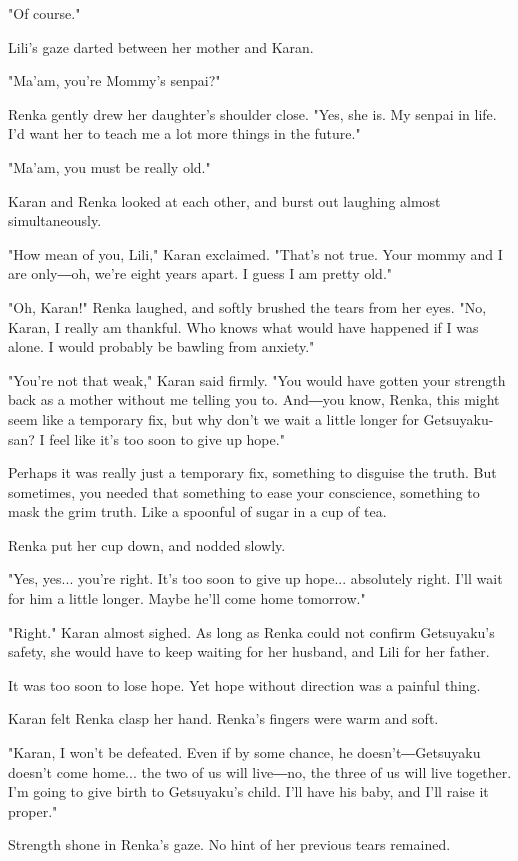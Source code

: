 "Of course."

Lili's gaze darted between her mother and Karan.

"Ma'am, you're Mommy's senpai?"

Renka gently drew her daughter's shoulder close. "Yes, she is. My senpai
in life. I'd want her to teach me a lot more things in the future."

"Ma'am, you must be really old."

Karan and Renka looked at each other, and burst out laughing almost
simultaneously.

"How mean of you, Lili," Karan exclaimed. "That's not true. Your mommy
and I are only―oh, we're eight years apart. I guess I am pretty old."

"Oh, Karan!" Renka laughed, and softly brushed the tears from her eyes.
"No, Karan, I really am thankful. Who knows what would have happened if
I was alone. I would probably be bawling from anxiety."

"You're not that weak," Karan said firmly. "You would have gotten your
strength back as a mother without me telling you to. And―you know,
Renka, this might seem like a temporary fix, but why don't we wait a
little longer for Getsuyaku-san? I feel like it's too soon to give up
hope."

Perhaps it was really just a temporary fix, something to disguise the
truth. But sometimes, you needed that something to ease your conscience,
something to mask the grim truth. Like a spoonful of sugar in a cup of
tea.

Renka put her cup down, and nodded slowly.

"Yes, yes... you're right. It's too soon to give up hope... absolutely
right. I'll wait for him a little longer. Maybe he'll come home
tomorrow."

"Right." Karan almost sighed. As long as Renka could not confirm
Getsuyaku's safety, she would have to keep waiting for her husband, and
Lili for her father.

It was too soon to lose hope. Yet hope without direction was a painful
thing.

Karan felt Renka clasp her hand. Renka's fingers were warm and soft.

"Karan, I won't be defeated. Even if by some chance, he
doesn't―Getsuyaku doesn't come home... the two of us will live―no, the
three of us will live together. I'm going to give birth to Getsuyaku's
child. I'll have his baby, and I'll raise it proper."

Strength shone in Renka's gaze. No hint of her previous tears remained.

